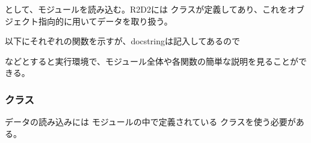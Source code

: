 \documentclass[letterpaper,10pt,dvipdfmx,report]{sphinxmanual}
\begin{document}
\begin{sphinxVerbatim}[commandchars=\\\{\}]
 
\end{sphinxVerbatim}

\sphinxAtStartPar
として、モジュールを読み込む。R2D2には {\hyperref[\detokenize{io:R2D2.R2D2_data}]{}} クラスが定義してあり、これをオブジェクト指向的に用いてデータを取り扱う。

\sphinxAtStartPar
以下にそれぞれの関数を示すが、docstringは記入してあるので

\begin{sphinxVerbatim}[commandchars=\\\{\}]
\end{sphinxVerbatim}

\sphinxAtStartPar
などとすると実行環境で、モジュール全体や各関数の簡単な説明を見ることができる。


\subsubsection{クラス}
\label{\detokenize{io:id4}}

\begin{fulllineitems}
\label{\detokenize{io:R2D2.R2D2_data}}
\pysigstartsignatures
{}
\pysigstopsignatures
\end{fulllineitems}


\sphinxAtStartPar
データの読み込みには  モジュールの中で定義されている  クラスを使う必要がある。

\begin{sphinxVerbatim}[commandchars=\\\{\}]
 
  
  
\end{sphinxVerbatim}
\end{document}
